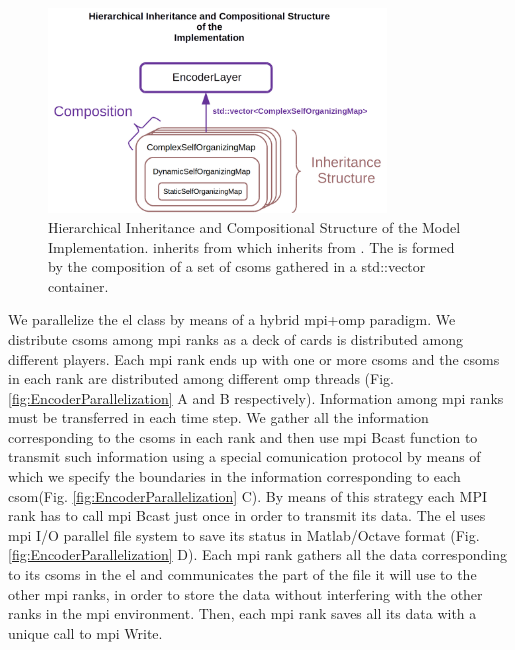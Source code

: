 \documentclass[10pt,letterpaper]{article}
\begin{document}
\begin{figure}[h!]
    \centering
    \includegraphics[width=0.8\textwidth]{Skeleton.png}
    \caption{Hierarchical Inheritance and Compositional Structure of the Model Implementation.
     inherits from  which inherits from .
    The  is formed by the composition of a set of \glspl{csom} gathered
    in a std::vector  container.}
    \label{fig:Skeleton}
\end{figure}

\pagebreak

We parallelize the \gls{el} class by means of a hybrid \gls{mpi}+\gls{omp} paradigm.
We distribute \glspl{csom} among \gls{mpi} ranks as a deck of cards is distributed among different players.
Each \gls{mpi} rank ends up with one or more \glspl{csom} and the \glspl{csom} in each rank are distributed
among different \gls{omp} threads (Fig. \ref{fig:EncoderParallelization} A and B respectively).
Information among \gls{mpi} ranks must be transferred in each time step.
We gather all the information corresponding to the \glspl{csom}
in each rank and then use \gls{mpi} Bcast function to transmit such information
using a special comunication protocol by means of which we specify the boundaries
in the information corresponding to each \gls{csom}(Fig. \ref{fig:EncoderParallelization} C).
By means of this strategy each MPI rank has to call \gls{mpi} Bcast just once
in order to transmit its data.
The \gls{el} uses \gls{mpi} I/O parallel file system to save its status in Matlab/Octave format
(Fig. \ref{fig:EncoderParallelization} D).
Each \gls{mpi} rank gathers all the data corresponding to its \glspl{csom} in the \gls{el} and
communicates the part of the file it will use to the other \gls{mpi} ranks, in order to store the data
without interfering with the other ranks in the \gls{mpi} environment.
Then, each \gls{mpi} rank saves all its data with a unique call to \gls{mpi} Write. 
\end{document}
